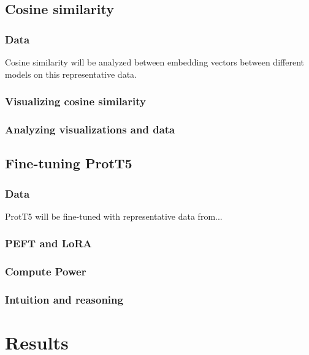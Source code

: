 \documentclass[
	letterpaper, %
	10pt, %
]{journalArticle}
\begin{document}
\subsection{Cosine similarity}

\subsubsection{Data}
Cosine similarity will be analyzed between embedding vectors between different models on this representative data.

\subsubsection{Visualizing cosine similarity}

\subsubsection{Analyzing visualizations and data}

\subsection{Fine-tuning ProtT5}

\subsubsection{Data}
ProtT5 will be fine-tuned with representative data from...

\subsubsection{PEFT and LoRA}

\subsubsection{Compute Power}

\subsubsection{Intuition and reasoning}



\section{Results}
\end{document}

